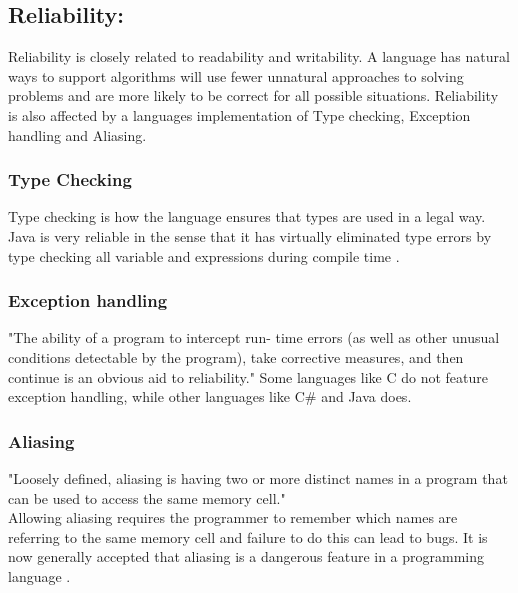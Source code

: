 \subsection*{Reliability:}
Reliability is closely related to readability and writability. A language has natural ways to support algorithms will use fewer unnatural approaches to solving problems and are more likely to be correct for all possible situations.
Reliability is also affected by a languages implementation of Type checking, Exception handling and Aliasing. 
\subsubsection*{Type Checking}
Type checking is how the language ensures that types are used in a legal way. Java is very reliable in the sense that it has virtually eliminated type errors by type checking all variable and expressions during compile time .
\subsubsection*{Exception handling}
"The ability of a program to intercept run- time errors (as well as other
unusual conditions detectable by the program), take corrective measures, and
then continue is an obvious aid to reliability."
Some languages like C do not feature exception handling, while other languages like C\# and Java does. 
\subsubsection*{Aliasing}
"Loosely defined, aliasing is having two or more distinct names in a program that can be used to access the same memory cell." \\
Allowing aliasing requires the programmer to remember which names are referring to the same memory cell and failure to do this can lead to bugs.  It is now generally accepted
that aliasing is a dangerous feature in a programming language .




